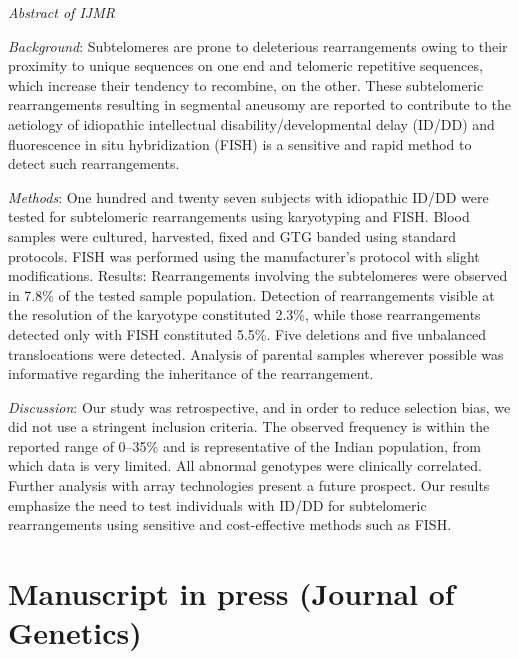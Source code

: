 \begin{quoting}[indentfirst=false]
\textit{Abstract of IJMR}

\textit{Background}: Subtelomeres are prone to deleterious rearrangements owing to their
proximity to unique sequences on one end and telomeric repetitive sequences,
which increase their tendency to recombine, on the other. These subtelomeric
rearrangements resulting in segmental aneusomy are reported to contribute to the
aetiology of idiopathic intellectual disability/developmental delay (ID/DD) and
fluorescence in situ hybridization (FISH) is a sensitive and rapid method to
detect such rearrangements.

\textit{Methods}: One hundred and twenty seven subjects with idiopathic ID/DD were tested for subtelomeric rearrangements using karyotyping and FISH. Blood samples were cultured, harvested, fixed and GTG banded using standard protocols. FISH was performed using the manufacturer’s protocol with slight modifications.
Results: Rearrangements involving the subtelomeres were observed in 7.8\% of the
tested sample population. Detection of rearrangements visible at the resolution
of the karyotype constituted 2.3\%, while those rearrangements detected only
with FISH constituted 5.5\%. Five deletions and five unbalanced translocations
were detected. Analysis of parental samples wherever possible was informative
regarding the inheritance of the rearrangement.

\textit{Discussion}: Our study was retrospective, and in order to reduce selection bias,
we did not use a stringent inclusion criteria. The observed frequency is within
the reported range of 0–35\% and is representative of the Indian population,
from which data is very limited. All abnormal genotypes were clinically
correlated. Further analysis with array technologies present a future prospect.
Our results emphasize the need to test individuals with ID/DD for subtelomeric
rearrangements using sensitive and cost-effective methods such as FISH.
\end{quoting}

\cleardoublepage
\section*{Manuscript in press (Journal of Genetics)}


